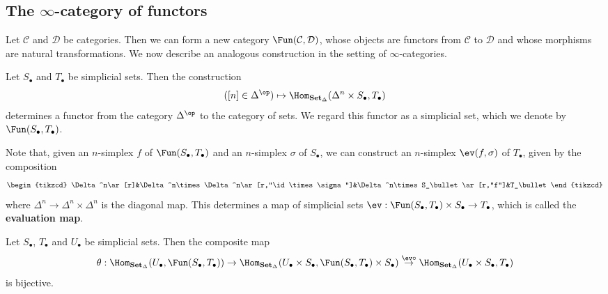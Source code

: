 \subsection{The \texorpdfstring{$\infty$}{inf}-category of functors}
Let $\mathcal{C}$ and $\mathcal{D}$ be categories. Then we can form a new category $\Fun(\mathcal{C},\mathcal{D})$, whose objects are functors from $\mathcal{C}$ to $\mathcal{D}$ and whose morphisms are natural transformations. We now describe an analogous construction in the setting of $\infty$-categories.\par
Let $S_\bullet$ and $T_\bullet$ be simplicial sets. Then the construction
\[([n]\in\Delta^{\op})\mapsto\Hom_{\mathbf{Set}_\Delta}(\Delta^n\times S_\bullet,T_\bullet)\]
determines a functor from the category $\Delta^{\op}$ to the category of sets. We regard this functor as a simplicial set, which we denote by $\Fun(S_\bullet,T_\bullet)$.\par
Note that, given an $n$-simplex $f$ of $\Fun(S_\bullet,T_\bullet)$ and an $n$-simplex $\sigma$ of $S_\bullet$, we can construct an $n$-simplex $\ev(f,\sigma)$ of $T_\bullet$, given by the composition
\[\begin{tikzcd}
\Delta^n\ar[r]&\Delta^n\times\Delta^n\ar[r,"\id\times\sigma"]&\Delta^n\times S_\bullet\ar[r,"f"]&T_\bullet
\end{tikzcd}\]
where $\Delta^n\to\Delta^n\times\Delta^n$ is the diagonal map. This determines a map of simplicial sets $\ev:\Fun(S_\bullet,T_\bullet)\times S_\bullet\to T_\bullet$, which is called the \textbf{evaluation map}.
\begin{proposition}\label{simplicial set Fun evaluation map adjoint prop}
Let $S_\bullet$, $T_\bullet$ and $U_\bullet$ be simplicial sets. Then the composite map
\[\theta:\Hom_{\mathbf{Set}_\Delta}(U_\bullet,\Fun(S_\bullet,T_\bullet))\to\Hom_{\mathbf{Set}_\Delta}(U_\bullet\times S_\bullet,\Fun(S_\bullet,T_\bullet)\times S_\bullet)\stackrel{\ev\circ}{\to}\Hom_{\mathbf{Set}_\Delta}(U_\bullet\times S_\bullet,T_\bullet)\]
is bijective.
\end{proposition}
